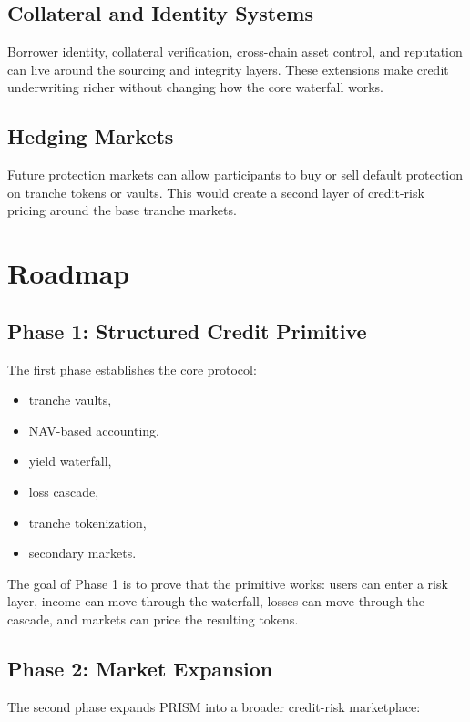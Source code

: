 \documentclass[11pt]{article}
\begin{document}
\subsection{Collateral and Identity Systems}

Borrower identity, collateral verification, cross-chain asset control, and
reputation can live around the sourcing and integrity layers. These extensions
make credit underwriting richer without changing how the core waterfall works.

\subsection{Hedging Markets}

Future protection markets can allow participants to buy or sell default
protection on tranche tokens or vaults. This would create a second layer of
credit-risk pricing around the base tranche markets.

\section{Roadmap}

\subsection{Phase 1: Structured Credit Primitive}

The first phase establishes the core protocol:

\begin{itemize}
  \item tranche vaults,
  \item NAV-based accounting,
  \item yield waterfall,
  \item loss cascade,
  \item tranche tokenization,
  \item secondary markets.
\end{itemize}

The goal of Phase 1 is to prove that the primitive works: users can enter a
risk layer, income can move through the waterfall, losses can move through the
cascade, and markets can price the resulting tokens.

\subsection{Phase 2: Market Expansion}

The second phase expands PRISM into a broader credit-risk marketplace:
\end{document}
